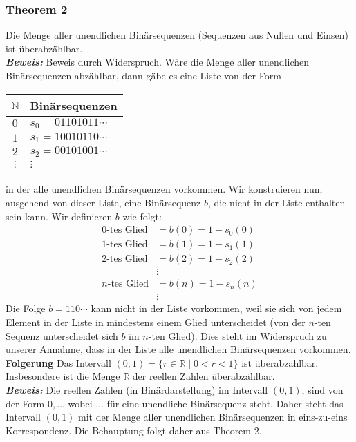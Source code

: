 \subsubsection{Theorem 2}%
\label{ssub:theorem_2}
Die Menge aller unendlichen Binärsequenzen (Sequenzen aus Nullen und Einsen) ist überabzählbar. \\
\textbf{\textit{Beweis: }}
Beweis durch Widerspruch. Wäre die Menge aller unendlichen Binärsequenzen abzählbar, dann gäbe es eine Liste von der Form
\begin{center}
\begin{tabular}{c|l}
$\mathbb{N}$ & Binärsequenzen\\
\hline
$0$ & $s_0=01101011\cdots$\\
$1$ & $s_1=10010110\cdots$\\
$2$ & $s_2=00101001\cdots$\\
$\vdots$ & $\vdots$
\end{tabular}
\end{center}
in der alle unendlichen Binärsequenzen vorkommen. Wir konstruieren nun, ausgehend von dieser Liste, eine Binärsequenz $b$, die nicht in der Liste enthalten sein kann. Wir definieren $b$ wie folgt:
\begin{align*}
0\text{-tes Glied}&=b(0)=1-s_0(0)\\
1\text{-tes Glied}&=b(1)=1-s_1(1)\\
2\text{-tes Glied}&=b(2)=1-s_2(2)\\
&\vdots\\
n\text{-tes Glied}&=b(n)=1-s_n(n)\\
&\vdots
\end{align*}
Die Folge $b=110\cdots$ kann nicht in der Liste vorkommen, weil sie sich von jedem Element in der Liste in mindestens
einem Glied unterscheidet (von der $n$-ten Sequenz unterscheidet sich $b$ im $n$-ten Glied). Dies steht im Widerspruch
zu unserer Annahme, dass in der Liste alle unendlichen Binärsequenzen vorkommen.\\
\textbf{Folgerung }
Das Intervall $(0,1)=\{r\in\mathbb{R}\mid 0<r<1 \}$ ist überabzählbar. Insbesondere ist die Menge $\mathbb{R}$ der reellen Zahlen
überabzählbar.\\
\textbf{\textit{Beweis: }}
Die reellen Zahlen (in Binärdarstellung) im Intervall $(0,1)$, sind von der Form $0,\dots$ wobei $\dots$ für eine
unendliche Binärsequenz steht. Daher steht das Intervall $(0,1)$ mit der Menge aller unendlichen Binärsequenzen in
eins-zu-eins Korrespondenz. Die Behauptung folgt daher aus Theorem 2.\\
